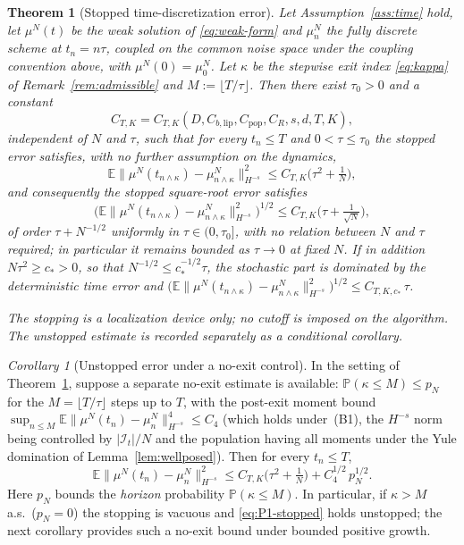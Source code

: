 \documentclass[a4paper,fleqn]{cas-sc}
\newtheorem{theorem}{Theorem}
\theoremstyle{definition}
\theoremstyle{remark}
\newtheorem{corollary}{Corollary}
\begin{document}
\begin{theorem}[Stopped time-discretization error]
\label{prop:time_discrete_particle}
Let Assumption~\ref{ass:time} hold, let $\mu^N(t)$ be the weak solution of
\eqref{eq:weak-form} and $\mu^N_n$ the fully discrete scheme at $t_n=n\tau$, coupled on
the common noise space under the coupling convention above, with $\mu^N(0)=\mu^N_0$. Let
$\kappa$ be the stepwise exit index \eqref{eq:kappa} of Remark~\ref{rem:admissible} and
$M:=\lfloor T/\tau\rfloor$. Then there
exist $\tau_0>0$ and a constant
\[
C_{T,K}=C_{T,K}(D,C_{b,\mathrm{lip}},C_{\mathrm{pop}},C_R,s,d,T,K),
\]
independent of $N$ and $\tau$, such that for every $t_n\le T$ and $0<\tau\le\tau_0$ the
\emph{stopped} error satisfies, with no further assumption on the dynamics,
\begin{equation}\label{eq:P1-stopped}
\mathbb E\big\|\mu^N(t_{n\wedge\kappa})-\mu^N_{n\wedge\kappa}\big\|_{H^{-s}}^2
\le C_{T,K}\Big(\tau^2+\tfrac{1}N\Big),
\end{equation}
and consequently the stopped square-root error satisfies
\begin{equation}\label{eq:P2}
\Big(\mathbb E\big\|\mu^N(t_{n\wedge\kappa})-\mu^N_{n\wedge\kappa}\big\|_{H^{-s}}^2\Big)^{1/2}
\le C_{T,K}\Big(\tau+\tfrac1{\sqrt N}\Big),
\end{equation}
of order $\tau+N^{-1/2}$ uniformly in $\tau\in(0,\tau_0]$, with \emph{no} relation between $N$ and
$\tau$ required; in particular it remains bounded as $\tau\to0$ at fixed $N$. If in addition
$N\tau^2\ge c_*>0$, so that $N^{-1/2}\le c_*^{-1/2}\tau$, the stochastic part is dominated by the
deterministic time error and $\big(\mathbb E\|\mu^N(t_{n\wedge\kappa})-\mu^N_{n\wedge\kappa}\|_{H^{-s}}^2\big)^{1/2}\le C_{T,K,c_*}\,\tau$.

The stopping is a localization device only; no cutoff is imposed on the algorithm. The unstopped
estimate is recorded separately as a conditional corollary.
\end{theorem}

\begin{corollary}[Unstopped error under a no-exit control]\label{cor:unstopped}
In the setting of Theorem~\ref{prop:time_discrete_particle}, suppose a separate no-exit estimate is
available: $\mathbb P(\kappa\le M)\le p_N$ for the $M=\lfloor T/\tau\rfloor$ steps up to $T$, with
the post-exit moment bound $\sup_{n\le M}\mathbb E\|\mu^N(t_n)-\mu^N_n\|_{H^{-s}}^4\le C_4$ (which
holds under~(B1), the $H^{-s}$ norm being controlled by $|\mathcal I_t|/N$ and the population having
all moments under the Yule domination of Lemma~\ref{lem:wellposed}). Then for every $t_n\le T$,
\begin{equation}\label{eq:P1}
\mathbb E\big\|\mu^N(t_n)-\mu^N_n\big\|_{H^{-s}}^2
\le C_{T,K}\Big(\tau^2+\tfrac1N\Big)+C_4^{1/2}\,p_N^{1/2}.
\end{equation}
Here $p_N$ bounds the \emph{horizon} probability $\mathbb P(\kappa\le M)$. In particular, if
$\kappa>M$ a.s.\ ($p_N=0$) the stopping is vacuous and \eqref{eq:P1-stopped} holds unstopped; the next
corollary provides such a no-exit bound under bounded positive growth.
\end{corollary}
\end{document}
